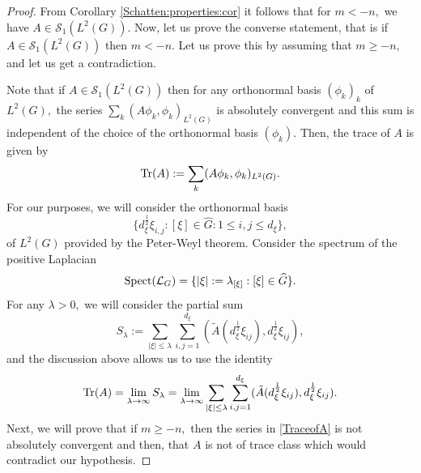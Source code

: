 \documentclass[12pt, reqno]{amsart}
\theoremstyle{definition}
\theoremstyle{remark}
\numberwithin{equation}{section}
\begin{document}
\begin{proof} From Corollary \ref{Schatten:properties:cor} it follows that for $m<-n,$ we have $A\in \mathscr{S}_1(L^2(G)).$ Now, let us prove the converse statement, that is if $A\in \mathscr{S}_1(L^2(G))$ then $m<-n.$ Let us prove this by assuming that $m\geq -n,$   and let us get a contradiction.

Note that if $A\in \mathscr{S}_1(L^2(G))$ then for any orthonormal basis $(\phi_k)_{k}$ of $L^2(G),$ the series $\sum_{k}(A\phi_k,\phi_k)_{L^2(G)}$ is absolutely convergent  and this sum is independent of the choice of the orthonormal basis $(\phi_k).$ Then, the trace of $A$ is given by 
\begin{equation}
    \textnormal{Tr}(A):=\sum_{k}(A\phi_k,\phi_k)_{L^2(G)}.
\end{equation}
For our purposes, we will consider the orthonormal basis
\begin{equation}\label{Peter:Weyl}
 \{d_{\xi}^{\frac{1}{2}}\xi_{i,j}:{[\xi]\in \widehat{G}:1\leq i,j\leq d_\xi}\},   
\end{equation}
 of $L^2(G)$ provided by the Peter-Weyl theorem. Consider the spectrum of the positive Laplacian $$ \textnormal{Spect}(\mathcal{L}_G)=\{|\xi|:=\lambda_{[\xi]}:[\xi]\in \widehat{G}\}.$$  For any $\lambda>0,$ we will consider the partial sum
\begin{equation}
    S_{\lambda}:=  \sum_{|\xi|\leq \lambda}  \sum_{i,j=1}^{d_\xi}(\tilde{A}(d_\xi^{\frac{1}{2}}\xi_{ij}),d_\xi^{\frac{1}{2}}\xi_{ij}),
\end{equation} and the discussion above allows us to use the identity
\begin{equation}\label{TraceofA}
    \textnormal{Tr}(A)=\lim_{\lambda\rightarrow \infty}S_{\lambda}=\lim_{\lambda\rightarrow \infty}\sum_{|\xi|\leq \lambda}  \sum_{i,j=1}^{d_\xi}(\tilde{A}(d_\xi^{\frac{1}{2}}\xi_{ij}),d_\xi^{\frac{1}{2}}\xi_{ij}).
\end{equation}Next, we  will prove that if $m\geq -n,$ then the series in \eqref{TraceofA} is not absolutely convergent and then, that $A$ is not of trace class which would contradict our hypothesis.


\end{proof}
\end{document}
